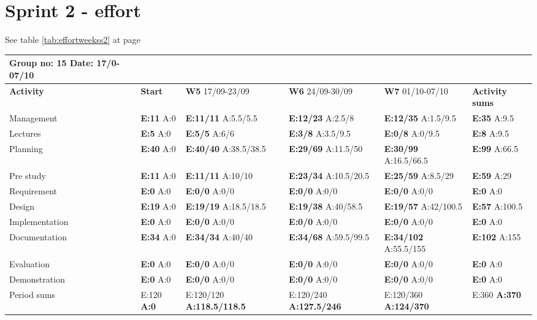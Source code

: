 \section{Sprint 2 - effort}

See table \ref{tab:effortweekss2} at page \pageref{tab:effortweekss2}
\begin{table}
\begin{tabularx}{\linewidth}{>{\setlength\hsize{.625\hsize}}X|>{\setlength\hsize{0.3\hsize}}X|>{\setlength\hsize{0.5\hsize}}X|>{\setlength\hsize{0.5\hsize}}X|>{\setlength\hsize{0.5\hsize}}X|>{\setlength\hsize{.3\hsize}}X}
Group no: 15 Date: 17/0-07/10  \\ \hline
\textbf{Activity} & \textbf{Start} & \textbf{W5} 17/09-23/09 & \textbf{W6} 24/09-30/09 & \textbf{W7} 01/10-07/10 & \textbf{Activity sums} \\ \hline \hline
Management & \textbf{E:11} A:0 & \textbf{E:11/11} A:5.5/5.5 & \textbf{E:12/23} A:2.5/8 & \textbf{E:12/35} A:1.5/9.5 & \textbf{E:35} A:9.5  \\ \hline
Lectures & \textbf{E:5} A:0 & \textbf{E:5/5} A:6/6 & \textbf{E:3/8} A:3.5/9.5 & \textbf{E:0/8} A:0/9.5 & \textbf{E:8 } A:9.5  \\ \hline
Planning & \textbf{E:40} A:0 & \textbf{E:40/40} A:38.5/38.5 & \textbf{E:29/69} A:11.5/50 & \textbf{E:30/99} A:16.5/66.5 & \textbf{E:99 } A:66.5  \\ \hline
Pre study & \textbf{E:11} A:0 & \textbf{E:11/11} A:10/10 & \textbf{E:23/34} A:10.5/20.5 & \textbf{E:25/59} A:8.5/29 & \textbf{E:59} A:29  \\ \hline
Requirement & \textbf{E:0} A:0 & \textbf{E:0/0} A:0/0 & \textbf{E:0/0} A:0/0 & \textbf{E:0/0} A:0/0 & \textbf{E:0} A:0  \\ \hline
Design & \textbf{E:19} A:0 & \textbf{E:19/19} A:18.5/18.5 & \textbf{E:19/38} A:40/58.5 & \textbf{E:19/57} A:42/100.5 & \textbf{E:57} A:100.5  \\ \hline
Implementation & \textbf{E:0} A:0 & \textbf{E:0/0} A:0/0 & \textbf{E:0/0} A:0/0 & \textbf{E:0/0} A:0/0 & \textbf{E:0} A:0  \\ \hline
Documentation & \textbf{E:34} A:0 & \textbf{E:34/34} A:40/40 & \textbf{E:34/68} A:59.5/99.5 & \textbf{E:34/102} A:55.5/155 & \textbf{E:102 } A:155  \\ \hline
Evaluation & \textbf{E:0} A:0 & \textbf{E:0/0} A:0/0 & \textbf{E:0/0} A:0/0 & \textbf{E:0/0} A:0/0 & \textbf{E:0 } A:0  \\ \hline
Demonstration & \textbf{E:0} A:0 & \textbf{E:0/0} A:0/0 & \textbf{E:0/0} A:0/0 & \textbf{E:0/0} A:0/0 & \textbf{E:0 } A:0  \\ \hline
Period sums & E:120 \textbf{A:0} & E:120/120 \textbf{A:118.5/118.5} & E:120/240 \textbf{A:127.5/246} & E:120/360 \textbf{A:124/370} & E:360 \textbf{A:370} \\ \hline
\end{tabularx}



\end{table}
